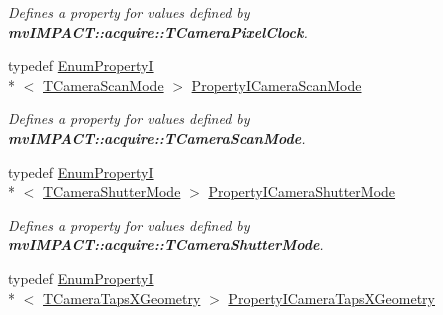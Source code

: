 \begin{DoxyCompactItemize}
\begin{DoxyCompactList}\small\item\em Defines a property for values defined by {\bfseries mv\+I\+M\+P\+A\+C\+T\+::acquire\+::\+T\+Camera\+Pixel\+Clock}. \end{DoxyCompactList}\item 
\hypertarget{group___device_specific_interface_ga762c072be6a70ec34c79682ae145f677}{typedef \hyperlink{classmv_i_m_p_a_c_t_1_1acquire_1_1_enum_property_i}{Enum\+Property\+I}\\*
$<$ \hyperlink{group___device_specific_interface_gaf4fc430c8da5f7825766e0a542f26801}{T\+Camera\+Scan\+Mode} $>$ \hyperlink{group___device_specific_interface_ga762c072be6a70ec34c79682ae145f677}{Property\+I\+Camera\+Scan\+Mode}}\label{group___device_specific_interface_ga762c072be6a70ec34c79682ae145f677}

\begin{DoxyCompactList}\small\item\em Defines a property for values defined by {\bfseries mv\+I\+M\+P\+A\+C\+T\+::acquire\+::\+T\+Camera\+Scan\+Mode}. \end{DoxyCompactList}\item 
\hypertarget{group___device_specific_interface_gae67620addf31f8c9a17c46d8a7e5464a}{typedef \hyperlink{classmv_i_m_p_a_c_t_1_1acquire_1_1_enum_property_i}{Enum\+Property\+I}\\*
$<$ \hyperlink{group___device_specific_interface_ga20dd9ab797852e2e4b9a81bf8de2f2d6}{T\+Camera\+Shutter\+Mode} $>$ \hyperlink{group___device_specific_interface_gae67620addf31f8c9a17c46d8a7e5464a}{Property\+I\+Camera\+Shutter\+Mode}}\label{group___device_specific_interface_gae67620addf31f8c9a17c46d8a7e5464a}

\begin{DoxyCompactList}\small\item\em Defines a property for values defined by {\bfseries mv\+I\+M\+P\+A\+C\+T\+::acquire\+::\+T\+Camera\+Shutter\+Mode}. \end{DoxyCompactList}\item 
\hypertarget{group___device_specific_interface_gadb3acd27da51bc318c073aa7d052607b}{typedef \hyperlink{classmv_i_m_p_a_c_t_1_1acquire_1_1_enum_property_i}{Enum\+Property\+I}\\*
$<$ \hyperlink{group___device_specific_interface_ga25ba65893f1ee0e7de99cb51bb858d99}{T\+Camera\+Taps\+X\+Geometry} $>$ \hyperlink{group___device_specific_interface_gadb3acd27da51bc318c073aa7d052607b}{Property\+I\+Camera\+Taps\+X\+Geometry}}\label{group___device_specific_interface_gadb3acd27da51bc318c073aa7d052607b}


\end{DoxyCompactItemize}
